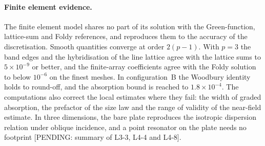 {\paragraph{Finite element evidence.} The finite element model shares no part of its solution with the Green-function, lattice-sum and Foldy references, and reproduces them to the accuracy of the discretisation. Smooth quantities converge at order $2(p-1)$. With $p=3$ the band edges and the hybridisation of the line lattice agree with the lattice sums to $5\times10^{-9}$ or better, and the finite-array coefficients agree with the Foldy solution to below $10^{-6}$ on the finest meshes. In configuration~B the Woodbury identity holds to round-off, and the absorption bound is reached to $1.8\times10^{-4}$. The computations also correct the local estimates where they fail: the width of graded absorption, the prefactor of the size law and the range of validity of the near-field estimate. In three dimensions, the bare plate reproduces the isotropic dispersion relation under oblique incidence, and a point resonator on the plate needs no footprint [PENDING: summary of L3-3, L4-4 and L4-8].
}
